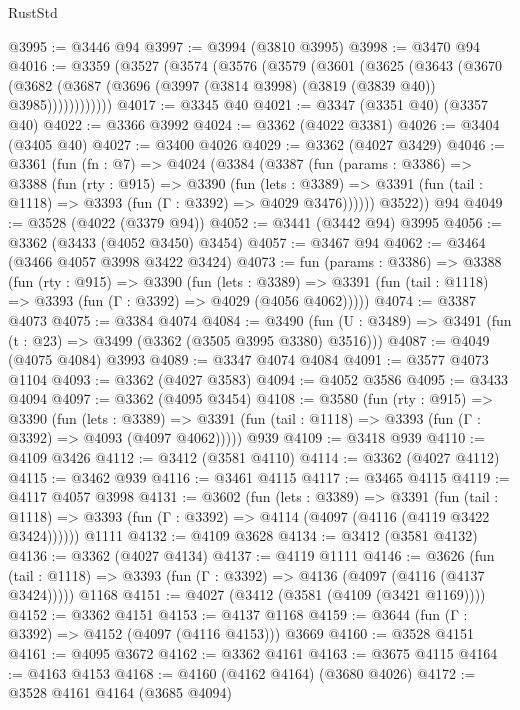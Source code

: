 \begin{lexlean}{RustStd}
\begin{coremodule}
@3995 := @3446 @94
@3997 := @3994 (@3810 @3995)
@3998 := @3470 @94
@4016 := @3359
    (@3527
      (@3574
        (@3576
          (@3579
            (@3601
              (@3625
                (@3643
                  (@3670
                    (@3682 (@3687 (@3696 (@3997 (@3814 @3998) (@3819 (@3839 @40)) @3985))))))))))))
@4017 := @3345 @40
@4021 := @3347 (@3351 @40) (@3357 @40)
@4022 := @3366 @3992
@4024 := @3362 (@4022 @3381)
@4026 := @3404 (@3405 @40)
@4027 := @3400 @4026
@4029 := @3362 (@4027 @3429)
@4046 := @3361
    (fun (fn : @7) =>
    @4024
      (@3384
        (@3387
          (fun (params : @3386) =>
          @3388
            (fun (rty : @915) =>
            @3390
              (fun (lets : @3389) =>
              @3391 (fun (tail : @1118) => @3393 (fun (Γ : @3392) => @4029 @3476))))))
        @3522))
    @94
@4049 := @3528 (@4022 (@3379 @94))
@4052 := @3441 (@3442 @94) @3995
@4056 := @3362 (@3433 (@4052 @3450) @3454)
@4057 := @3467 @94
@4062 := @3464 (@3466 @4057 @3998 @3422 @3424)
@4073 := fun (params : @3386) =>
  @3388
    (fun (rty : @915) =>
    @3390
      (fun (lets : @3389) =>
      @3391 (fun (tail : @1118) => @3393 (fun (Γ : @3392) => @4029 (@4056 @4062)))))
@4074 := @3387 @4073
@4075 := @3384 @4074
@4084 := @3490 (fun (U : @3489) => @3491 (fun (t : @23) => @3499 (@3362 (@3505 @3995 @3380) @3516)))
@4087 := @4049 (@4075 @4084) @3993
@4089 := @3347 @4074 @4084
@4091 := @3577 @4073 @1104
@4093 := @3362 (@4027 @3583)
@4094 := @4052 @3586
@4095 := @3433 @4094
@4097 := @3362 (@4095 @3454)
@4108 := @3580
    (fun (rty : @915) =>
    @3390
      (fun (lets : @3389) =>
      @3391 (fun (tail : @1118) => @3393 (fun (Γ : @3392) => @4093 (@4097 @4062)))))
    @939
@4109 := @3418 @939
@4110 := @4109 @3426
@4112 := @3412 (@3581 @4110)
@4114 := @3362 (@4027 @4112)
@4115 := @3462 @939
@4116 := @3461 @4115
@4117 := @3465 @4115
@4119 := @4117 @4057 @3998
@4131 := @3602
    (fun (lets : @3389) =>
    @3391
      (fun (tail : @1118) => @3393 (fun (Γ : @3392) => @4114 (@4097 (@4116 (@4119 @3422 @3424))))))
    @1111
@4132 := @4109 @3628
@4134 := @3412 (@3581 @4132)
@4136 := @3362 (@4027 @4134)
@4137 := @4119 @1111
@4146 := @3626
    (fun (tail : @1118) => @3393 (fun (Γ : @3392) => @4136 (@4097 (@4116 (@4137 @3424)))))
    @1168
@4151 := @4027 (@3412 (@3581 (@4109 (@3421 @1169))))
@4152 := @3362 @4151
@4153 := @4137 @1168
@4159 := @3644 (fun (Γ : @3392) => @4152 (@4097 (@4116 @4153))) @3669
@4160 := @3528 @4151
@4161 := @4095 @3672
@4162 := @3362 @4161
@4163 := @3675 @4115
@4164 := @4163 @4153
@4168 := @4160 (@4162 @4164) (@3680 @4026)
@4172 := @3528 @4161 @4164 (@3685 @4094)

\end{coremodule}
\end{lexlean}
